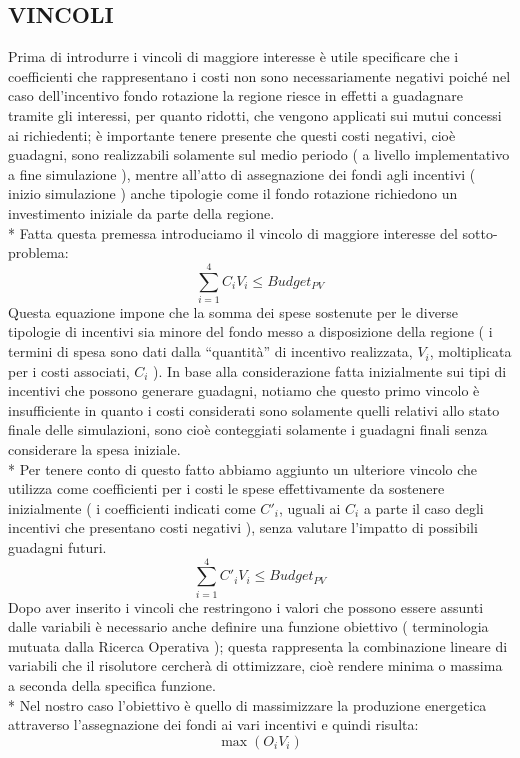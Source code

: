 \documentclass[12pt,a4paper,openright,twoside]{report}
\begin{document}
\subsection{VINCOLI}
Prima di introdurre i vincoli di maggiore interesse è utile specificare che i coefficienti che rappresentano i costi non sono necessariamente negativi poiché nel caso dell'incentivo fondo rotazione la regione riesce in effetti a guadagnare tramite gli interessi, per quanto ridotti, che vengono applicati sui mutui concessi ai richiedenti; è importante tenere presente che questi costi negativi, cioè guadagni, sono realizzabili solamente sul medio periodo ( a livello implementativo a fine simulazione ), mentre all'atto di assegnazione dei fondi agli incentivi ( inizio simulazione ) anche tipologie come il fondo rotazione richiedono un investimento iniziale da parte della regione. \\*
Fatta questa premessa introduciamo il vincolo di maggiore interesse del sotto-problema:
\begin{equation} \label{eq:vincoloCosti}
	\sum_{i=1}^4 C_i V_i \leq Budget_{PV}  
\end{equation}
Questa equazione impone che la somma dei spese sostenute per le diverse tipologie di incentivi sia minore del fondo messo a disposizione della regione ( i termini di spesa sono dati dalla “quantità” di incentivo realizzata, $V_i$, moltiplicata per i costi associati, 	$C_i$ ).
In base alla considerazione fatta inizialmente sui tipi di incentivi che possono generare guadagni, notiamo che questo primo vincolo è insufficiente in quanto i costi considerati sono solamente quelli relativi allo stato finale delle simulazioni, sono cioè conteggiati solamente i guadagni finali senza considerare la spesa iniziale. \\*
Per tenere conto di questo fatto abbiamo aggiunto un ulteriore vincolo che utilizza come coefficienti per i costi le spese effettivamente da sostenere inizialmente ( i coefficienti indicati come $C'_i$, uguali ai $C_i$ a parte il caso degli incentivi che presentano costi negativi ), senza valutare l'impatto di possibili guadagni futuri.
\begin{equation} \label{eq:vincoloCostiCorretti}
	\sum_{i=1}^4 C'_i V_i \leq Budget_{PV}  
\end{equation}
Dopo aver inserito i vincoli che restringono i valori che possono essere assunti dalle variabili è necessario anche definire una funzione obiettivo ( terminologia mutuata dalla Ricerca Operativa ); questa rappresenta la combinazione lineare di variabili che il risolutore cercherà di ottimizzare, cioè rendere minima o massima a seconda della specifica funzione.\\*
Nel nostro caso l'obiettivo è quello di massimizzare la produzione energetica attraverso l'assegnazione dei fondi ai vari incentivi e quindi risulta:
\begin{equation} \label{eq:funzObiettivo}
	\max ( O_i V_i )  
\end{equation}
\end{document}

